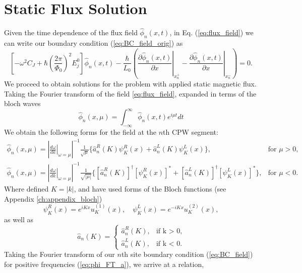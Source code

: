 \section{Static Flux Solution}\label{eq:Static_Flux}
%
Given the time dependence of the flux field $\hat{\phi}_n(x,t)$, in Eq. (\ref{eq:flux_field}) we can write our boundary condition (\ref{eq:BC_field_orig}) as
%
\begin{equation}\label{eq:BC_field}
\left[-\omega^2 C_{J}+\hbar\left(\frac{2 \pi}{\Phi_{0}}\right)^{2} E_{j}^0\right]\hat{\phi}_n(x,t) -\frac{\hbar}{L_{0}}\left(\left.\frac{\partial \hat{\phi}_n(x,t)}{\partial x}\right|_{x_n^{+}}-\left.\frac{\partial \hat{\phi}_n(x,t)}{\partial x}\right|_{x_n^{-}}\right)=0.
\end{equation}
%
We proceed to obtain solutions for the problem with applied static magnetic flux. Taking the Fourier transform of the field \ref{eq:flux_field}, expanded in terms of the bloch waves
\begin{equation}\label{eq:field_FT}
    \hat{\phi}_n(x, \mu) = \int_{-\infty}^\infty \hat{\phi}_n(x,t) e^{i\mu t} dt
\end{equation}
%
We obtain the following forms for the field at the $n$th CPW segment:
\begin{subequations} \label{eq:phi_FT}
\begin{eqnarray}
    \hat{\phi}_n(x, \mu) =  \left|\left.\frac{d\omega}{dk}\right|_{\omega=\mu}\right|^{-1}\frac{1}{\sqrt{\mu}}\biggl\lbrace \hat{a}_n^R(K) \psi^R_K(x) + \hat{a}_n^L(K)\psi_K^L(x)\biggr\rbrace, &\text{for } \mu > 0, \label{eq:phi_FT_a}\\
    \hat{\phi}_n(x, \mu) = \left|\left.\frac{d\omega}{dk}\right|_{\omega=\mu}\right|^{-1}\frac{1}{\sqrt{|\mu|}}\biggl\lbrace [\hat{a}^R_n(K)]^\dagger \left[\psi^R_K(x)\right]^* + [\hat{a}_n^L(K)]^\dagger\left[\psi_K^L(x)\right]^*\biggr\rbrace, &\text{for } \mu < 0. \label{eq:phi_FT_b}
\end{eqnarray}
\end{subequations}
%
Where defined $K = |k|$, and have used forms of the Bloch functions (see Appendix \ref{ch:appendix_bloch})
%
\begin{equation}\label{eq:bloch_waves}
    \psi_{K}^R (x) =e^{iKx} u_{K}^{(1)}(x), \hspace{12pt}  \psi_{K}^L(x) =e^{-iKx} u_{K}^{(2)}(x),
\end{equation}
%
as well as 
\begin{equation}
    \hat{a}_n(K) = 
    \begin{cases}
    \hat{a}_n^R(K), &\text{if k > 0,}\\
    \hat{a}_n^L(K), &\text{if k < 0.}
    \end{cases}
\end{equation}
%
Taking the Fourier transform of our $n$th site boundary condition (\ref{eq:BC_field}) for positive frequencies (\ref{eq:phi_FT_a}), we arrive at a relation,

